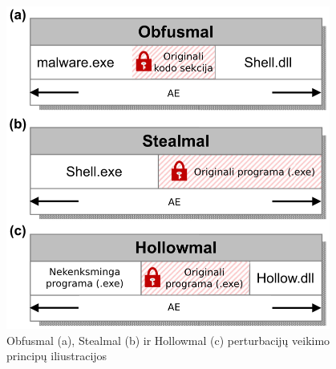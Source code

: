 \begin{figure}[h]
    \begin{small}
        \begin{center}
            \includegraphics[width=0.95\textwidth]{img/perturbations.png}
        \end{center}
        \caption{Obfusmal (a), Stealmal (b) ir Hollowmal (c) perturbacijų veikimo principų iliustracijos \cite{zhongReinforcementLearningBased2022}}\label{fig:perturbations}
    \end{small}
\end{figure}